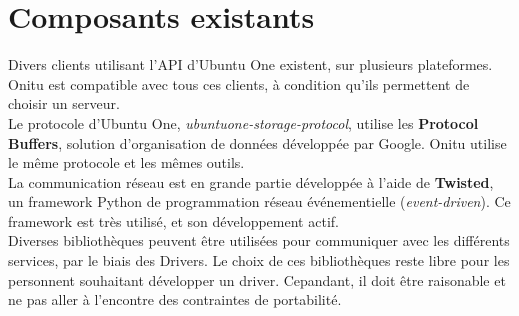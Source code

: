 \section{Composants existants}
\thispagestyle{EIP} %
Divers clients utilisant l'API d'Ubuntu One existent, sur plusieurs plateformes. Onitu est compatible avec tous ces clients, à condition qu'ils permettent de choisir un serveur.\\

Le protocole d'Ubuntu One, \textit{ubuntuone-storage-protocol}, utilise les \textbf{Protocol Buffers}, solution d'organisation de données développée par Google. Onitu utilise le même protocole et les mêmes outils.\\

La communication réseau est en grande partie développée à l'aide de \textbf{Twisted}, un framework Python de programmation réseau événementielle (\emph{event-driven}). Ce framework est très utilisé, et son développement actif.\\

Diverses bibliothèques peuvent être utilisées pour communiquer avec les différents services, par le biais des Drivers. Le choix de ces bibliothèques reste libre pour les personnent souhaitant développer un driver. Cepandant, il doit être raisonable et ne pas aller à l'encontre des contraintes de portabilité.